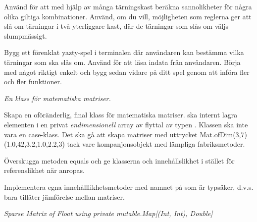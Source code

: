 \Subtask Använd  för att med hjälp av många tärningskast beräkna sannolikheter för några olika giltiga kombinationer. Använd, om du vill, möjligheten som reglerna ger att slå om tärningar i två yterliggare kast, där de tärningar som slås om väljs slumpmässigt.

\Subtask Bygg ett förenklat yazty-spel i terminalen där användaren kan bestämma vilka tärningar som ska slås om. Använd  för att läsa indata från användaren. Börja med något riktigt enkelt och bygg sedan vidare på ditt spel genom att införa fler och fler funktioner.



\AdvancedTasks %


\Task \emph{En klass för matematiska matriser.}

\Subtask Skapa en oföränderlig, final klass  för matematiska matriser.  ska internt lagra elementen i en privat \emph{endimensionell} array av flyttal av typen . Klassen ska inte vara en case-klass. Det ska gå att skapa matriser med uttrycket Mat.ofDim(3,7)(1.0,42,3.2,1.0,2.2,3) tack vare  kompanjonsobjekt med lämpliga fabriksmetoder. 

\Subtask Överskugga metoden equals och ge klasserna  och  innehållslikhet i stället för referenslikhet när \code{==} anropas.

\Subtask Implementera egna innehålllikhetsmetoder med namnet \code{===} på  som är typsäker, d.v.s. bara tillåter jämförelse mellan matriser.


\Subtask \emph{Sparse Matrix of Float using private mutable.Map[(Int, Int), Double]}


    